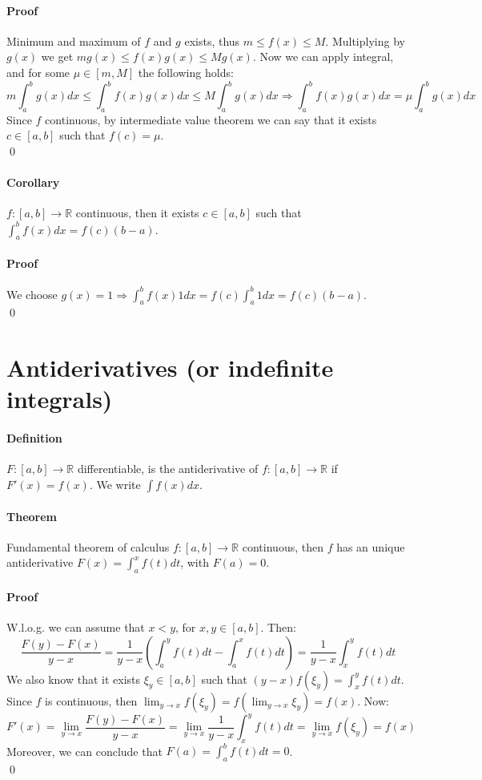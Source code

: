 \documentclass{article}
\newcommand{\DS}{\displaystyle}
\newcommand{\functoR}[2]{#1 : #2 \rightarrow \mathbb{R}}
\newcommand{\intcc}[1]{\left[#1\right]}
\newcommand{\Def}{\paragraph{Definition}}
\newcommand{\Theorem}{\paragraph{Theorem}}
\newcommand{\Corollary}{\paragraph{Corollary}}
\newcommand{\Proof}{\paragraph{Proof}}
\begin{document}
	\Proof Minimum and maximum of $f$ and $g$ exists, thus $m \leq f(x) \leq M$.
	Multiplying by $g(x)$ we get $mg(x) \leq f(x)g(x) \leq Mg(x)$. Now we can
	apply integral, and for some $\mu \in \intcc{m,M}$ the following holds:
	\begin{equation*}
		m \int_a^b g(x) dx \leq \int_a^b f(x)g(x) dx \leq M \int_a^b g(x) dx
		\Rightarrow \int_a^b f(x)g(x) dx = \mu \int_a^b g(x) dx
	\end{equation*}
	Since $f$ continuous, by intermediate value theorem we can say that it exists
	$c \in \intcc{a,b}$ such that $f(c) = \mu$.
\\\qed

	\Corollary $\functoR{f}{\intcc{a,b}}$ continuous, then it exists $c \in
	\intcc{a,b}$ such that $\int_a^b f(x) dx = f(c) (b-a)$.

	\Proof We choose $g(x) = 1 \Rightarrow \int_a^b f(x) 1 dx = f(c) \int_a^b
	1 dx = f(c) (b-a)$.
\\\qed

\section{Antiderivatives (or indefinite integrals)}

	\Def $\functoR{F}{\intcc{a,b}}$ differentiable, is the antiderivative of
	$\functoR{f}{\intcc{a,b}}$ if $F'(x) = f(x)$. We write $\int f(x) dx$.

	\Theorem Fundamental theorem of calculus
	$\functoR{f}{\intcc{a,b}}$ continuous, then $f$ has an unique antiderivative
	$F(x) = \int_a^x f(t) dt$, with $F(a) = 0$.

	\Proof W.l.o.g. we can assume that $x < y$, for $x,y \in \intcc{a,b}$. Then:
	\begin{equation*}
		\frac{F(y)-F(x)}{y-x} =
		\frac{1}{y-x}\left(\int_a^y f(t) dt - \int_a^x f(t) dt\right) =
		\frac{1}{y-x} \int_x^y f(t) dt
	\end{equation*}
	We also know that it exists $\xi_y \in \intcc{a,b}$ such that $(y-x) f(\xi_y)
	= \int_x^y f(t) dt$. Since $f$ is continuous, then $\DS \lim_{y \to x} f(\xi_y)
	= f(\lim_{y \to x} \xi_y) = f(x)$. Now:
	\begin{equation*}
		F'(x) =
		\lim_{y \to x} \frac{F(y)-F(x)}{y-x} =
		\lim_{y \to x} \frac{1}{y-x} \int_x^y f(t) dt =
		\lim_{y \to x} f(\xi_y) = f(x)
	\end{equation*}
	Moreover, we can conclude that $F(a) = \int_a^b f(t) dt = 0$.
\\\qed
\end{document}

